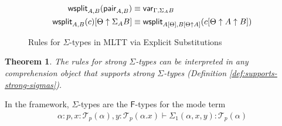 \documentclass[10pt]{article}
\newtheorem{theorem}{Theorem}
\theoremstyle{definition}
\newcommand{\yields}{\vdash}
\newcommand\El[2]{\mathcal{T}_{#1}(#2)}
\begin{document}
\begin{figure}
\begin{mathpar}
\end{mathpar}
\begin{align}
\mathsf{wsplit}_{A,B}(\mathsf{pair}_{A,B}) &\equiv \var{\Gamma, \Sigma_A B} \\
\mathsf{wsplit}_{A,B}(c)[\Theta \uparrow \Sigma_A B] &\equiv \mathsf{wsplit}_{A[\Theta],B[\Theta \uparrow A]}(c[\Theta \uparrow A \uparrow B]) \\
\end{align}
\caption{Rules for $\Sigma$-types in MLTT via Explicit Substitutions}\label{fig:qit-sigma-rules}
\end{figure}

\begin{theorem}
The rules for strong $\Sigma$-types can be interpreted in any comprehension object that supports strong $\Sigma$-types (Definition \ref{def:supports-strong-sigmas}).
\end{theorem}

In the framework, $\Sigma$-types are the $\mathsf{F}$-types for the mode term
\begin{align*}
\alpha : p, x : \El{p}{\alpha}, y : \El{p}{\alpha.x} \yields \Sigma_1(\alpha,x,y) : \El{p}{\alpha}
\end{align*}
\end{document}
